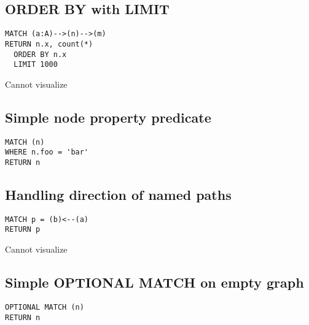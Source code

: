 \subsection{ORDER BY with LIMIT}

\begin{lstlisting}
MATCH (a:A)-->(n)-->(m)
RETURN n.x, count(*)
  ORDER BY n.x
  LIMIT 1000
\end{lstlisting}

Cannot visualize
\subsection{Simple node property predicate}

\begin{lstlisting}
MATCH (n)
WHERE n.foo = 'bar'
RETURN n
\end{lstlisting}

\subsection{Handling direction of named paths}

\begin{lstlisting}
MATCH p = (b)<--(a)
RETURN p
\end{lstlisting}

Cannot visualize
\subsection{Simple OPTIONAL MATCH on empty graph}

\begin{lstlisting}
OPTIONAL MATCH (n)
RETURN n
\end{lstlisting}

